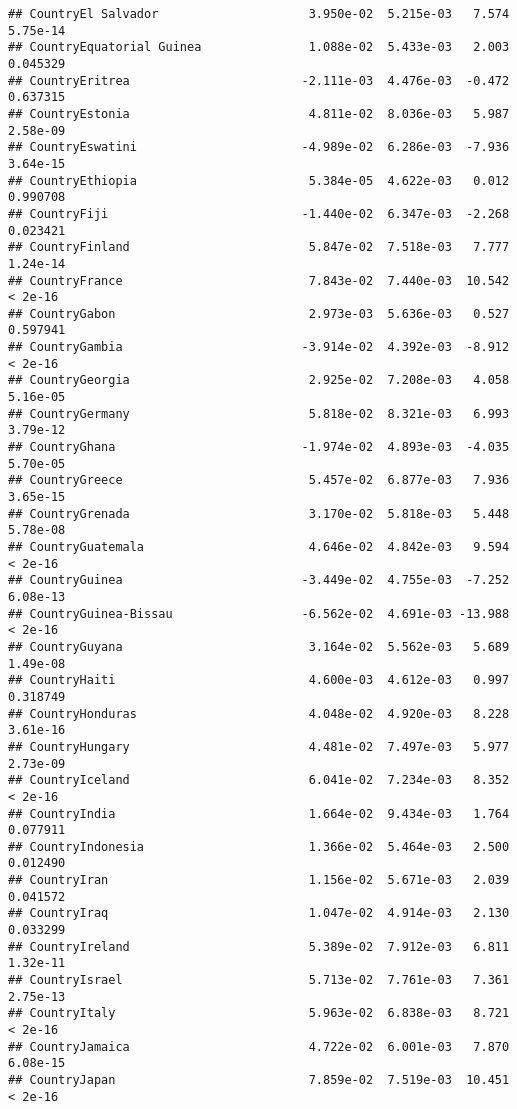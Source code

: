 \documentclass[
]{article}
\begin{document}
\begin{verbatim}
## CountryEl Salvador                     3.950e-02  5.215e-03   7.574 5.75e-14
## CountryEquatorial Guinea               1.088e-02  5.433e-03   2.003 0.045329
## CountryEritrea                        -2.111e-03  4.476e-03  -0.472 0.637315
## CountryEstonia                         4.811e-02  8.036e-03   5.987 2.58e-09
## CountryEswatini                       -4.989e-02  6.286e-03  -7.936 3.64e-15
## CountryEthiopia                        5.384e-05  4.622e-03   0.012 0.990708
## CountryFiji                           -1.440e-02  6.347e-03  -2.268 0.023421
## CountryFinland                         5.847e-02  7.518e-03   7.777 1.24e-14
## CountryFrance                          7.843e-02  7.440e-03  10.542  < 2e-16
## CountryGabon                           2.973e-03  5.636e-03   0.527 0.597941
## CountryGambia                         -3.914e-02  4.392e-03  -8.912  < 2e-16
## CountryGeorgia                         2.925e-02  7.208e-03   4.058 5.16e-05
## CountryGermany                         5.818e-02  8.321e-03   6.993 3.79e-12
## CountryGhana                          -1.974e-02  4.893e-03  -4.035 5.70e-05
## CountryGreece                          5.457e-02  6.877e-03   7.936 3.65e-15
## CountryGrenada                         3.170e-02  5.818e-03   5.448 5.78e-08
## CountryGuatemala                       4.646e-02  4.842e-03   9.594  < 2e-16
## CountryGuinea                         -3.449e-02  4.755e-03  -7.252 6.08e-13
## CountryGuinea-Bissau                  -6.562e-02  4.691e-03 -13.988  < 2e-16
## CountryGuyana                          3.164e-02  5.562e-03   5.689 1.49e-08
## CountryHaiti                           4.600e-03  4.612e-03   0.997 0.318749
## CountryHonduras                        4.048e-02  4.920e-03   8.228 3.61e-16
## CountryHungary                         4.481e-02  7.497e-03   5.977 2.73e-09
## CountryIceland                         6.041e-02  7.234e-03   8.352  < 2e-16
## CountryIndia                           1.664e-02  9.434e-03   1.764 0.077911
## CountryIndonesia                       1.366e-02  5.464e-03   2.500 0.012490
## CountryIran                            1.156e-02  5.671e-03   2.039 0.041572
## CountryIraq                            1.047e-02  4.914e-03   2.130 0.033299
## CountryIreland                         5.389e-02  7.912e-03   6.811 1.32e-11
## CountryIsrael                          5.713e-02  7.761e-03   7.361 2.75e-13
## CountryItaly                           5.963e-02  6.838e-03   8.721  < 2e-16
## CountryJamaica                         4.722e-02  6.001e-03   7.870 6.08e-15
## CountryJapan                           7.859e-02  7.519e-03  10.451  < 2e-16

\end{verbatim}
\end{document}
